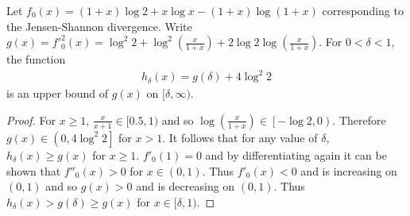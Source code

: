 \begin{lemma}\label{lemma:upper-bound-JS}
Let $f_0(x) = \left(1+x\right) \log 2 + x\log x - \left( 1 + x\right) \log \left(1+x\right)$ corresponding to the Jensen-Shannon divergence.
Write $g(x) = f'^2_0(x) = \log^2 2 + \log^2\left( \frac{x}{1+x} \right) + 2\log 2 \log\left( \frac{x}{1+x} \right)$.
For $0< \delta < 1$, the function
\begin{align*}
    h_\delta(x) = g(\delta) + 4\log^2 2
\end{align*}
is an upper bound of $g(x)$ on $[\delta, \infty)$.
\end{lemma}
\begin{proof}
For $x\geq1$,  $\frac{x}{x+1} \in [0.5, 1)$ and so $\log\left( \frac{x}{1+x} \right) \in \left[-\log2, 0\right)$.
Therefore $g(x) \in \left(0, 4\log^2 2\right]$ for $x>1$.
It follows that for any value of $\delta$, $h_\delta(x) \geq g(x)$ for $x\geq1$.
$f'_0(1)=0$ and by differentiating again it can be shown that $f''_0(x) > 0$ for $x\in(0,1)$.
Thus $f'_0(x)<0$ and is increasing on $(0,1)$ and so $g(x) > 0$ and is decreasing on $(0,1)$.
Thus $h_\delta(x) > g(\delta) \geq g(x)$ for $x \in [\delta, 1)$.
\end{proof}

\medskip

